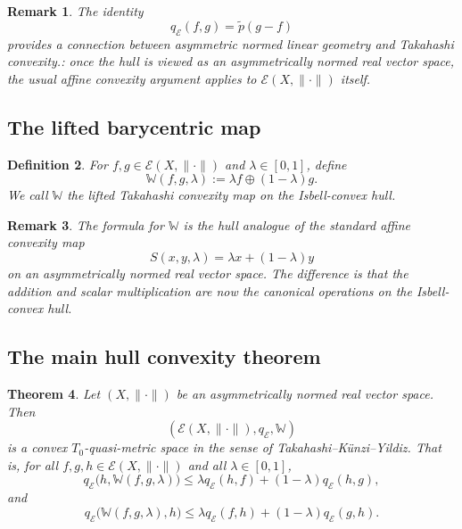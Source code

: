 \documentclass[preprint,12pt]{elsarticle}
\numberwithin{equation}{section}
\newtheorem{theorem}{Theorem}[section]
\newtheorem{definition}[theorem]{Definition}
\newtheorem{remark}[theorem]{Remark}
\newcommand{\E}{\mathcal{E}}
\begin{document}
\begin{remark}\label{rem:qEfromptilde}
The identity
\[
q_{\E}(f,g)=\widetilde p(g-f)
\]
provides a connection between asymmetric normed linear geometry and Takahashi convexity.:
once the hull is viewed as an asymmetrically normed real vector space, the
usual affine convexity argument applies to \(\E(X,\|\cdot\|)\) itself.
\end{remark}

\subsection{The lifted barycentric map}

\begin{definition}\label{def:Wlift}
For \(f,g\in\E(X,\|\cdot\|)\) and \(\lambda\in[0,1]\), define
\[
\mathbb W(f,g,\lambda):=\lambda f\oplus(1-\lambda)g.
\]
We call \(\mathbb W\) the \emph{lifted Takahashi convexity map} on the
Isbell-convex hull.
\end{definition}

\begin{remark}\label{rem:WliftMotivation}
The formula for \(\mathbb W\) is the hull analogue of the standard affine
convexity map
\[
S(x,y,\lambda)=\lambda x+(1-\lambda)y
\]
on an asymmetrically normed real vector space.  The difference is that the
addition and scalar multiplication are now the canonical operations on the
Isbell-convex hull.
\end{remark}

\subsection{The main hull convexity theorem}

\begin{theorem}\label{thm:HullConvex}
Let \((X,\|\cdot\|)\) be an asymmetrically normed real vector space.  Then
\[
(\E(X,\|\cdot\|),q_{\E},\mathbb W)
\]
is a convex \(T_{0}\)-quasi-metric space in the sense of Takahashi--K\"unzi--Yildiz.
That is, for all \(f,g,h\in\E(X,\|\cdot\|)\) and all \(\lambda\in[0,1]\),
\[
q_{\E}\bigl(h,\mathbb W(f,g,\lambda)\bigr)
\le
\lambda q_{\E}(h,f)+(1-\lambda)q_{\E}(h,g),
\]
and
\[
q_{\E}\bigl(\mathbb W(f,g,\lambda),h\bigr)
\le
\lambda q_{\E}(f,h)+(1-\lambda)q_{\E}(g,h).
\]
\end{theorem}
\end{document}
